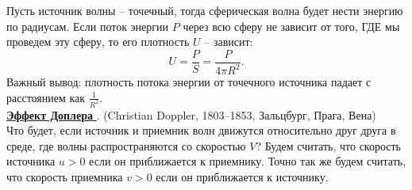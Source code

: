  Пусть источник волны -- точечный, тогда сферическая волна будет нести энергию по радиусам. Если поток энергии $P$ через всю сферу не зависит от того, ГДЕ мы проведем эту сферу, то его плотность $U$ -- зависит:
 \begin{displaymath}
 U=\frac{P}{S}=\frac{P}{4\pi R^2}.
 \end{displaymath}
 Важный вывод: плотность потока энергии от точечного источника падает с расстоянием как $\frac1{R^2}$.\\

 \underline{\bf Эффект Доплера }. (Christian Doppler, 1803--1853, Зальцбург, Прага, Вена)\\
 Что будет, если источник и приемник волн движутся относительно друг друга в среде, где волны распространяются со скоростью $V$? Будем считать, что скорость источника $u>0$ если он приближается к приемнику. Точно так же будем считать, что скорость приемника $v>0$ если он приближается к источнику.
